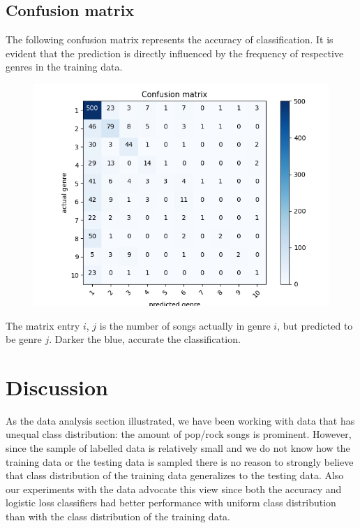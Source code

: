 \documentclass[fleqn,10pt]{SelfArx} %
\begin{document}
\subsection{Confusion matrix}
The following confusion matrix represents the accuracy of classification. It is evident that the prediction is directly influenced by the frequency of respective genres in the training data.
\begin{figure}[H]
  \includegraphics[width=\linewidth]{confusion-matrix.jpg}
\end{figure}

The matrix entry $i$, $j$ is the number of songs actually in genre $i$, but predicted to be genre $j$. Darker the blue, accurate the classification.

\section{Discussion}

As the data analysis section illustrated, we have been working with data that
has unequal class distribution: the amount of pop/rock songs is prominent.
However, since the sample of labelled data is relatively small and we do not
know how the training data or the testing data is sampled there is no reason to
strongly believe that class distribution of the training data generalizes to the
testing data. Also our experiments with the data advocate this view since both
the accuracy and logistic loss classifiers had better performance with uniform
class distribution than with the class distribution of the training data.
\end{document}
